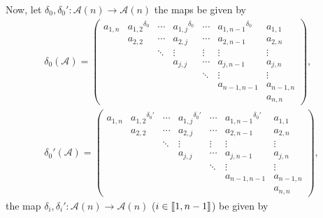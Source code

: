 \documentclass[10pt,a4paper]{amsart}
\numberwithin{equation}{section}
\def\d{\delta}
\def\A{\mathscr{A}}
\def\lbb#1{\left[\kern-0.15em\left[ {#1} \right] \kern-0.15em\right]}
\begin{document}
Now, let $\d_0, \d_0'\colon \A(n) \rightarrow \A(n)$ the maps be given by
\begin{gather*}%
\d_0(\A)=
 \begin{pmatrix}
 a_{1,n} &{a_{1,2}}^{\d_0} & \cdots & {a_{1,j}}^{\d_0}& \cdots &{a_{1,n-1}}^{\d_0}& a_{1,1} \\[1pt]
 & a_{2,2} & \cdots & a_{2,j} & \cdots &a_{2,n-1} &a_{2,n}\\[1pt]
 & & \ddots & \vdots & \vdots & \vdots & \vdots \\[1pt]
 & & & a_{j,j} & \cdots &a_{j,n-1} &a_{j,n}\\[1pt]
 & & & & \ddots & \vdots & \vdots \\[1pt]
 & & & & & a_{n-1,n-1}& a_{n-1,n}\\[1pt]
 & & & & & & a_{n,n}
 \end{pmatrix}
, \\
\d_0'(\A)=
 \begin{pmatrix}
 a_{1,n} & {a_{1,2}}^{\d_0'} & \cdots & {a_{1,j}}^{\d_0'}& \cdots &{a_{1,n-1}}^{\d_0'} & a_{1,1} \\[1pt]
 & a_{2,2} & \cdots & a_{2,j} & \cdots &a_{2,n-1} &a_{2,n}\\[1pt]
 & & \ddots & \vdots & \vdots & \vdots & \vdots \\[1pt]
 & & & a_{j,j} & \cdots &a_{j,n-1} &a_{j,n}\\[1pt]
 & & & & \ddots & \vdots & \vdots \\[1pt]
 & & & & & a_{n-1,n-1}& a_{n-1,n}\\[1pt]
 & & & & & & a_{n,n}
 \end{pmatrix},
\end{gather*}
the map $\d_i, \d_i'\colon \A(n) \rightarrow \A(n)$ ($i \in \lbb{1,n-1}$) be given by
\end{document}

